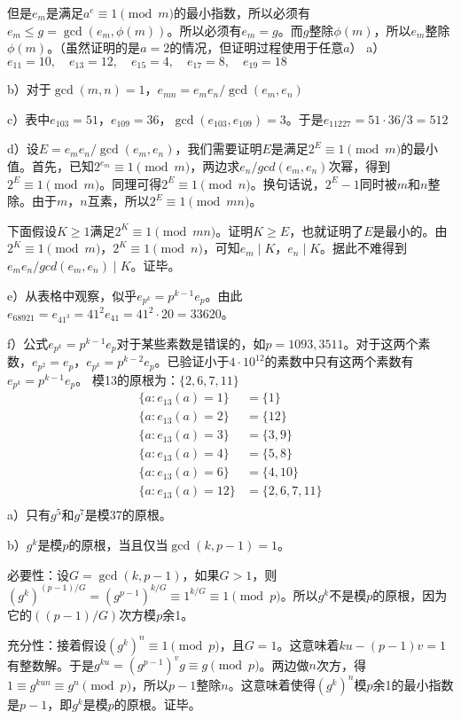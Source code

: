 但是$e_m$是满足$a^e\equiv1\pmod m$的最小指数，所以必须有$e_m\le g=\gcd(e_m,\phi(m))$。所以必须有$e_m=g$。而$g$整除$\phi(m)$，所以$e_m$整除$\phi(m)$。（虽然证明的是$a=2$的情况，但证明过程使用于任意$a$）
%
\exercise a）$e_{11}=10,\quad
e_{13}=12,\quad
e_{15}=4,\quad
e_{17}=8,\quad
e_{19}=18$\par
b）对于$\gcd(m,n)=1$，$e_{mn}=e_me_n/\gcd(e_m,e_n)$\par
c）表中$e_{103}=51$，$e_{109}=36$，$\gcd(e_{103},e_{109})=3$。于是$e_{11227}=51\cdot36/3=512$\par
d）设$E=e_me_n/\gcd(e_m,e_n)$，我们需要证明$E$是满足$2^E\equiv1\pmod m$的最小值。首先，已知$2^{e_m}\equiv1\pmod m$，两边求$e_n/gcd(e_m,e_n)$次幂，得到$2^E\equiv1\pmod m$。同理可得$2^E\equiv1\pmod n$。换句话说，$2^E-1$同时被$m$和$n$整除。由于$m$，$n$互素，所以$2^E\equiv 1\pmod{mn}$。\par
下面假设$K\ge1$满足$2^K\equiv1\pmod{mn}$。证明$K\ge E$，也就证明了$E$是最小的。由$2^K\equiv1\pmod{m}$，$2^K\equiv1\pmod{n}$，可知$e_m\mid K$，$e_n\mid K$。据此不难得到$e_me_n/gcd(e_m,e_n)\mid K$。证毕。\par
e）从表格中观察，似乎$e_{p^k}=p^{k-1}e_p$。由此$e_{68921}=e_{41^3}=41^2e_{41}=41^2\cdot20=33620$。\par
f）公式$e_{p^k}=p^{k-1}e_p$对于某些素数是错误的，如$p=1093,3511$。对于这两个素数，$e_{p^2}=e_p$，$e_{p^k}=p^{k-2}e_p$。已验证小于$4\cdot10^{12}$的素数中只有这两个素数有$e_{p^k}=p^{k-1}e_p$。
% 
\exercise 模13的原根为：$\{2,6,7,11\}$
\begin{align*}
\{a:e_{13}(a)=1\}&=\{1\}\\
\{a:e_{13}(a)=2\}&=\{12\}\\
\{a:e_{13}(a)=3\}&=\{3,9\}\\
\{a:e_{13}(a)=4\}&=\{5,8\}\\
\{a:e_{13}(a)=6\}&=\{4,10\}\\
\{a:e_{13}(a)=12\}&=\{2,6,7,11\}\\
\end{align*}
%
\exercise a）只有$g^5$和$g^7$是模37的原根。\par
b）$g^k$是模$p$的原根，当且仅当$\gcd(k, p-1)=1$。\par
\proof 必要性：设$G=\gcd(k, p-1)$，如果$G>1$，则$(g^k)^{(p-1)/G}=(g^{p-1})^{k/G}\equiv1^{k/G}\equiv1\pmod p$。所以$g^k$不是模$p$的原根，因为它的$((p-1)/G)$次方模$p$余1。\par
充分性：接着假设$(g^k)^n\equiv1\pmod p$，且$G=1$。这意味着$ku-(p-1)v=1$有整数解。于是$g^{ku}=(g^{p-1})^vg\equiv g\pmod p$。两边做$n$次方，得$1\equiv g^{kun}\equiv g^n\pmod p$，所以$p-1$整除$n$。这意味着使得$(g^k)^n$模$p$余1的最小指数是$p-1$，即$g^k$是模$p$的原根。证毕。\par
